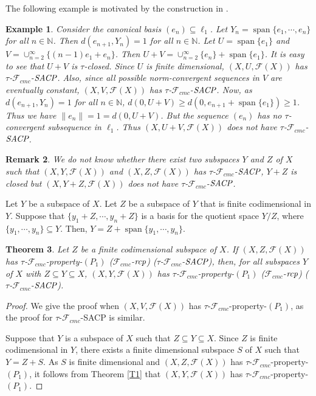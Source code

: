 \documentclass[11pt]{amsart}
\newtheorem{thm}{Theorem}[section]
\newtheorem{rem}[thm]{Remark}
\newtheorem{ex}[thm]{Example}
\newcommand{\ci}{\subseteq}
\newcommand{\mb}{\mathbb}
\newcommand{\mc}{\mathcal}
\newcommand{\mr}{\mathscr}
\newcommand{\iy}{\infty}
\newcommand{\ercp}{\bf{\emph{rcp}}}
\newcommand{\eSACP}{\bf{\emph{SACP}}}
\DeclareMathOperator{\spn}{span}
\begin{document}
The following example is motivated by the construction in \cite[Theorem~3]{IP}.
\begin{ex}
Consider the canonical basis $(e_n)\ci\ell_1$. Let $Y_n=\spn\{e_1,\cdots,e_n\}$ for all $n\in\mb{N}$. Then $d(e_{n+1},Y_n)=1$ for all $n\in\mb{N}$. Let $U=\spn\{e_1\}$ and $V=\cup_{n=2}^\iy\{(n-1)e_1+e_n\}$. Then $U+V=\cup_{n=2}^\iy\{e_n\}+\spn\{e_1\}$. It is easy to see that $U+V$ is $\tau$-closed. Since $U$ is finite dimensional, $(X,U,\mc{F}(X))$ has $\tau$-$\mr{F}_{cmc}$-$\eSACP$. Also, since all possible  norm-convergent sequences in $V$ are eventually constant, $(X,V,\mc{F}(X))$ has $\tau$-$\mr{F}_{cmc}$-$\eSACP$. Now, as $d(e_{n+1},Y_n)=1$ for all $n\in\mb{N}$, $d(0,U+V)\geq d(0,e_{n+1}+\spn\{e_1\})\geq 1$. Thus we have $\|e_n\|=1=d(0,U+V)$. But the sequence $(e_n)$ has no $\tau$-convergent subsequence in $\ell_1$. Thus $(X,U+V,\mc{F}(X))$ does not have $\tau$-$\mr{F}_{cmc}$-$\eSACP$.
\end{ex}
\begin{rem}
We do not know whether there exist two subspaces $Y$ and $Z$ of $X$ such that $(X,Y,\mc{F}(X))$ and $(X,Z,\mc{F}(X))$ has $\tau$-$\mr{F}_{cmc}$-$\eSACP$, $Y+Z$ is closed but $(X,Y+Z,\mc{F}(X))$ does not have $\tau$-$\mr{F}_{cmc}$-$\eSACP$.
\end{rem}
Let $Y$ be a subspace of $X$. Let $Z$ be a subspace of $Y$ that is finite codimensional in $Y$. Suppose that $\{y_1+Z,\cdots,y_n+Z\}$ is a basis for the quotient space $Y/Z$, where $\{y_1,\cdots,y_n\}\ci Y$. Then, $Y=Z+\spn\{y_1,\cdots,y_n\}$.
\begin{thm}
Let $Z$ be a finite codimensional subspace of $X$. If $(X,Z,\mc{F}(X))$ has $\tau$-$\mr{F}_{cmc}$-property-$(P_1)$ ($\mr{F}_{cmc}$-$\ercp$) ($\tau$-$\mr{F}_{cmc}$-$\eSACP$), then, for all subspaces $Y$ of $X$ with $Z\ci Y\ci X$, $(X,Y,\mc{F}(X))$ has $\tau$-$\mr{F}_{cmc}$-property-$(P_1)$ ($\mr{F}_{cmc}$-$\ercp$) ($\tau$-$\mr{F}_{cmc}$-$\eSACP$).
\end{thm}
\begin{proof}
We give the proof when $(X,V,\mc{F}(X))$ has $\tau$-$\mr{F}_{cmc}$-property-$(P_1)$, as the proof for $\tau$-$\mr{F}_{cmc}$-SACP is similar.

Suppose that $Y$ is a subspace of $X$ such that $Z\ci Y\ci X$. Since $Z$ is finite codimensional in $Y$, there exists a finite dimensional subspace $S$ of $X$ such that $Y=Z+S$. As $S$ is finite dimensional and $(X,Z,\mc{F}(X))$ has $\tau$-$\mr{F}_{cmc}$-property-$(P_1)$, it follows from Theorem \ref{T1} that $(X,Y,\mc{F}(X))$ has $\tau$-$\mr{F}_{cmc}$-property-$(P_1)$.
\end{proof}
\end{document}
